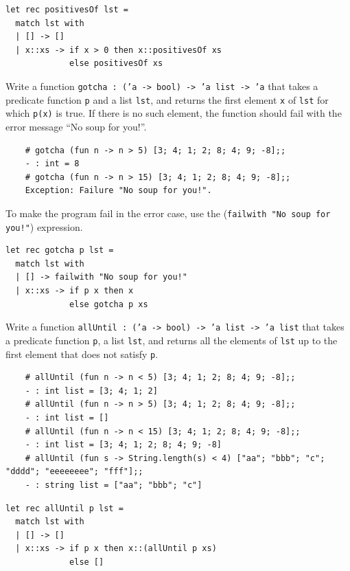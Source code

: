 \documentclass[addpoints]{exam}
\begin{document}
\begin{questions}
  \begin{solutionbox}{3.5cm}
    \begin{verbatim}
let rec positivesOf lst =
  match lst with
  | [] -> []
  | x::xs -> if x > 0 then x::positivesOf xs
             else positivesOf xs
    \end{verbatim}
  \end{solutionbox}

  
  \question 
  Write a function \texttt{gotcha : ('a -> bool) -> 'a list -> 'a} 
  that takes a predicate function \texttt{p} and a list \texttt{lst},
  and returns the first element \texttt{x} of \texttt{lst} for which 
  \texttt{p(x)} is true. If there is no such element,
  the function should fail with the error message 
  ``No soup for you!''.
  \begin{verbatim}
    # gotcha (fun n -> n > 5) [3; 4; 1; 2; 8; 4; 9; -8];;
    - : int = 8
    # gotcha (fun n -> n > 15) [3; 4; 1; 2; 8; 4; 9; -8];;
    Exception: Failure "No soup for you!".
  \end{verbatim}
  To make the program fail in the error case, use the 
  (\texttt{failwith "No soup for you!"}) expression.
  
  \begin{solutionbox}{3.5cm}
    \begin{verbatim}
let rec gotcha p lst =
  match lst with
  | [] -> failwith "No soup for you!"
  | x::xs -> if p x then x
             else gotcha p xs      
    \end{verbatim}
  \end{solutionbox}

  
  \question 
  Write a function \texttt{allUntil : ('a -> bool) -> 'a list -> 'a list} 
  that takes a predicate function \texttt{p}, a list \texttt{lst}, 
  and returns all the elements of \texttt{lst} up to the first element
  that does not satisfy \texttt{p}.
  \begin{verbatim}
    # allUntil (fun n -> n < 5) [3; 4; 1; 2; 8; 4; 9; -8];;
    - : int list = [3; 4; 1; 2]
    # allUntil (fun n -> n > 5) [3; 4; 1; 2; 8; 4; 9; -8];;
    - : int list = []
    # allUntil (fun n -> n < 15) [3; 4; 1; 2; 8; 4; 9; -8];;
    - : int list = [3; 4; 1; 2; 8; 4; 9; -8]
    # allUntil (fun s -> String.length(s) < 4) ["aa"; "bbb"; "c"; "dddd"; "eeeeeeee"; "fff"];;
    - : string list = ["aa"; "bbb"; "c"]
  \end{verbatim}
  
  \begin{solutionbox}{3.5cm}
    \begin{verbatim}
let rec allUntil p lst =
  match lst with
  | [] -> []
  | x::xs -> if p x then x::(allUntil p xs)
             else []
    \end{verbatim}
  \end{solutionbox}


\end{questions}
\end{document}
